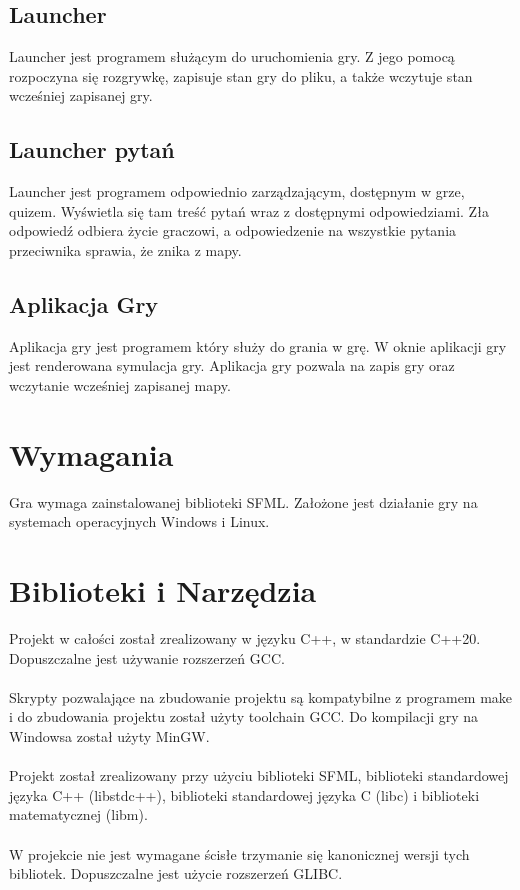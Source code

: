 \documentclass[12pt, titlepage]{article}
\begin{document}
\subsection{Launcher}
Launcher jest programem służącym do uruchomienia gry.
Z jego pomocą rozpoczyna się rozgrywkę, zapisuje stan gry do pliku, a także wczytuje stan 
wcześniej zapisanej gry.

\subsection{Launcher pytań}
Launcher jest programem odpowiednio zarządzającym, dostępnym w grze, quizem.
Wyświetla się tam treść pytań wraz z dostępnymi odpowiedziami. Zła odpowiedź odbiera
życie graczowi, a odpowiedzenie na wszystkie pytania przeciwnika sprawia, że znika z mapy.

\subsection{Aplikacja Gry}
Aplikacja gry jest programem który służy
do grania w grę. W oknie aplikacji gry jest
renderowana symulacja gry. Aplikacja gry pozwala na zapis gry oraz wczytanie wcześniej zapisanej mapy.

\section{Wymagania}
Gra wymaga zainstalowanej biblioteki
SFML. Założone jest działanie gry
na systemach operacyjnych Windows i
Linux.

\section{Biblioteki i Narzędzia}
Projekt w całości został zrealizowany
w języku C++, w standardzie C++20.
Dopuszczalne jest używanie rozszerzeń
GCC.
\\~\\
Skrypty pozwalające na zbudowanie
projektu są kompatybilne z
programem make i do zbudowania
projektu został użyty toolchain
GCC. Do kompilacji gry na Windowsa
został użyty MinGW.
\\~\\
Projekt został zrealizowany przy
użyciu biblioteki SFML, biblioteki
standardowej języka C++ (libstdc++),
biblioteki standardowej języka C (libc)
i biblioteki matematycznej (libm).
\\~\\
W projekcie nie jest wymagane ścisłe
trzymanie się kanonicznej wersji tych
bibliotek. Dopuszczalne jest użycie
rozszerzeń GLIBC.
\end{document}

